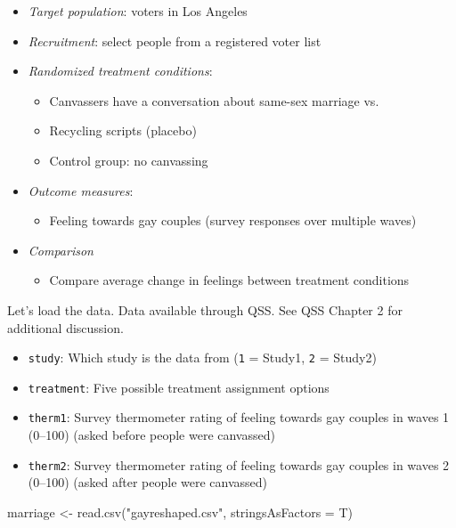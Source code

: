 \documentclass[
  letterpaper,
  DIV=11,
  numbers=noendperiod]{scrreprt}
\newenvironment{Shaded}{\begin{snugshade}}{\end{snugshade}}
\newcommand{\AttributeTok}[1]{\textcolor[rgb]{0.40,0.45,0.13}{#1}}
\newcommand{\FunctionTok}[1]{\textcolor[rgb]{0.28,0.35,0.67}{#1}}
\newcommand{\NormalTok}[1]{\textcolor[rgb]{0.00,0.23,0.31}{#1}}
\newcommand{\OtherTok}[1]{\textcolor[rgb]{0.00,0.23,0.31}{#1}}
\newcommand{\StringTok}[1]{\textcolor[rgb]{0.13,0.47,0.30}{#1}}
\providecommand{\tightlist}{%
  \setlength{\itemsep}{0pt}\setlength{\parskip}{0pt}}\usepackage{longtable,booktabs,array}
\begin{document}
\begin{itemize}
\tightlist
\item
  \emph{Target population}: voters in Los Angeles
\item
  \emph{Recruitment}: select people from a registered voter list
\item
  \emph{Randomized treatment conditions}:

  \begin{itemize}
  \tightlist
  \item
    Canvassers have a conversation about same-sex marriage vs.
  \item
    Recycling scripts (placebo)
  \item
    Control group: no canvassing
  \end{itemize}
\item
  \emph{Outcome measures}:

  \begin{itemize}
  \tightlist
  \item
    Feeling towards gay couples (survey responses over multiple waves)
  \end{itemize}
\item
  \emph{Comparison}

  \begin{itemize}
  \tightlist
  \item
    Compare average change in feelings between treatment conditions
  \end{itemize}
\end{itemize}

Let's load the data. Data available through QSS. See QSS Chapter 2 for
additional discussion.

\begin{itemize}
\tightlist
\item
  \texttt{study}: Which study is the data from (\texttt{1} = Study1,
  \texttt{2} = Study2)
\item
  \texttt{treatment}: Five possible treatment assignment options
\item
  \texttt{therm1}: Survey thermometer rating of feeling towards gay
  couples in waves 1 (0--100) (asked before people were canvassed)
\item
  \texttt{therm2}: Survey thermometer rating of feeling towards gay
  couples in waves 2 (0--100) (asked after people were canvassed)
\end{itemize}

\begin{Shaded}
\begin{Highlighting}[]
\NormalTok{marriage }\OtherTok{\textless{}{-}} \FunctionTok{read.csv}\NormalTok{(}\StringTok{"gayreshaped.csv"}\NormalTok{, }\AttributeTok{stringsAsFactors =}\NormalTok{ T)}
\end{Highlighting}
\end{Shaded}
\end{document}
